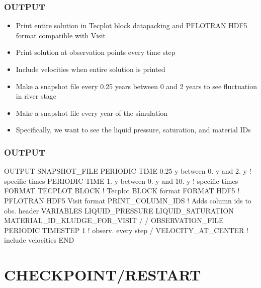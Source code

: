 \documentclass{beamer}
\newcommand\bluecomment[1]{{{\color{blue} #1}}}
\begin{document}
\begin{frame}[fragile]\frametitle{OUTPUT}

\begin{itemize}
\item Print entire solution in Tecplot block datapacking and PFLOTRAN HDF5 format compatible with Visit
\item Print solution at observation points every time step
\item Include velocities when entire solution is printed
\item Make a snapshot file every 0.25 years between 0 and 2 years to see fluctuation in river stage
\item Make a snapshot file every year of the simulation
\item Specifically, we want to see the liquid pressure, saturation, and material IDs
\end{itemize}

\end{frame}

\begin{frame}[fragile]\frametitle{OUTPUT}

\begin{semiverbatim}\small

OUTPUT
  SNAPSHOT_FILE
    PERIODIC TIME 0.25 y between 0. y and 2. y \bluecomment{! specific times}
    PERIODIC TIME 1. y between 0. y and 10. y  \bluecomment{! specific times}
    FORMAT TECPLOT BLOCK  \bluecomment{! Tecplot BLOCK format}
    FORMAT HDF5           \bluecomment{! PFLOTRAN HDF5 Visit format}
    PRINT_COLUMN_IDS      \bluecomment{! Adds column ids to obs. header}
    VARIABLES
      LIQUID_PRESSURE
      LIQUID_SATURATION
      MATERIAL_ID_KLUDGE_FOR_VISIT
    /
  /
  OBSERVATION_FILE
    PERIODIC TIMESTEP 1  \bluecomment{! observ. every step}
  /
  VELOCITY_AT_CENTER     \bluecomment{! include velocities}
END

\end{semiverbatim}

\end{frame}

\section{CHECKPOINT/RESTART}
\end{document}

